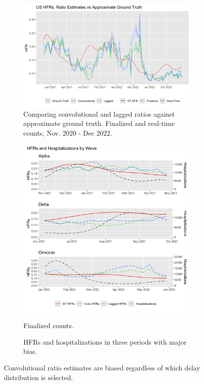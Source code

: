 \documentclass{article}
\begin{document}
\begin{figure}
     \centering
     \begin{subfigure}[b]{0.55\linewidth}
         \centering
         \includegraphics[width=\linewidth]{Figs/US_ests_realtime.png}
         \caption{Comparing convolutional and lagged ratios against approximate ground truth. Finalized and real-time counts, Nov. 2020 - Dec 2022.}
         \label{fig:basic_est_vs_gt}
     \end{subfigure}
     \hfill
     \begin{subfigure}[b]{0.4\linewidth}
         \centering
         \includegraphics[width=\linewidth]{Figs/hfrs_by_wave.png}
         \caption{HFRs and hospitalizations in three periods with major bias.} Finalized counts.
         \label{fig:wave}
     \end{subfigure}
        \caption{Convolutional ratio estimates are biased regardless of which delay distribution is selected.}
        \label{fig:basic_est_vs_gt_figs}
\end{figure}
\end{document}
